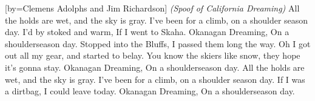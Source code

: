 [by={Clemens Adolphs and Jim Richardson}]
\textit{(Spoof of California Dreaming)}
\beginverse*
All the holds are wet,
and the sky is gray.
I've been for a climb,
on a shoulder season day.
I'd by stoked and warm,
If I went to Skaha.
Okanagan Dreaming,
On a shoulderseason day.
\endverse
\beginverse*
Stopped into the Bluffs,
I passed them long the way.
Oh I got out all my gear,
and started to belay.
You know the skiers like snow,
they hope it's gonna stay.
Okanagan Dreaming,
On a shoulderseason day.
\endverse
\beginverse*
All the holds are wet,
and the sky is gray.
I've been for a climb,
on a shoulder season day.
If I was a dirtbag,
I could leave today.
Okanagan Dreaming,
On a shoulderseason day.
\endverse
\endsong
